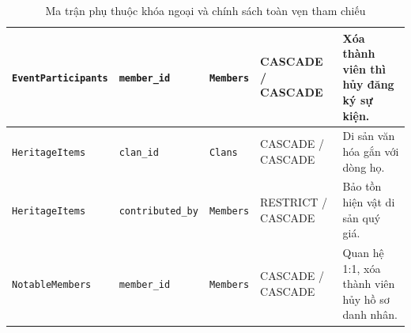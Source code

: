 \begin{table}[H]
\begin{tabularx}{\textwidth}{|l|l|l|l|X|}
        \hline
        \rowcolor{tablerowalt}
        \texttt{EventParticipants} & \texttt{member\_id} & \texttt{Members} & CASCADE / CASCADE & Xóa thành viên thì hủy đăng ký sự kiện. \\
        \hline
        \texttt{HeritageItems} & \texttt{clan\_id} & \texttt{Clans} & CASCADE / CASCADE & Di sản văn hóa gắn với dòng họ. \\
        \hline
        \rowcolor{tablerowalt}
        \texttt{HeritageItems} & \texttt{contributed\_by} & \texttt{Members} & RESTRICT / CASCADE & Bảo tồn hiện vật di sản quý giá. \\
        \hline
        \texttt{NotableMembers} & \texttt{member\_id} & \texttt{Members} & CASCADE / CASCADE & Quan hệ 1:1, xóa thành viên hủy hồ sơ danh nhân. \\
        \hline
    \end{tabularx}
    \caption{Ma trận phụ thuộc khóa ngoại và chính sách toàn vẹn tham chiếu}
    \label{tab:foreign_key_dependency_matrix}
\end{table}